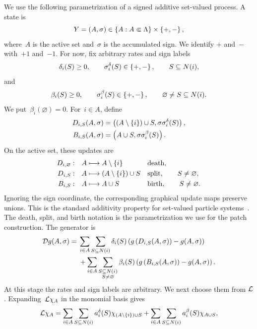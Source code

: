 We use the following parametrization of a signed additive set-valued process. A
state is
\begin{equation*}
Y=(A,\sigma)
\in
\left\{A:A\Subset\Lambda\right\}\times\left\{+,-\right\},
\end{equation*}
where~$A$ is the active set and~$\sigma$ is the accumulated sign. We identify
$+$ and~$-$ with~$+1$ and~$-1$. For now, fix arbitrary rates and sign labels
\begin{equation*}
\delta_i(S)\geq0,
\qquad
\sigma_i^\delta(S)\in\left\{+,-\right\},
\qquad
S\subseteq N(i),
\end{equation*}
and
\begin{equation*}
\beta_i(S)\geq0,
\qquad
\sigma_i^\beta(S)\in\left\{+,-\right\},
\qquad
\varnothing\neq S\subseteq N(i).
\end{equation*}
We put~$\beta_i(\varnothing)=0$. For~$i\in A$, define
\begin{align*}
D_{i,S}(A,\sigma)
&=
\left(\left(A\setminus\left\{i\right\}\right)\cup S,
\sigma\sigma_i^\delta(S)\right),
\\
B_{i,S}(A,\sigma)
&=
\left(A\cup S,
\sigma\sigma_i^\beta(S)\right).
\end{align*}
On the active set, these updates are
\begin{align*}
D_{i,\varnothing}:&\quad A\longmapsto A\setminus\left\{i\right\}
&&\text{death},
\\
D_{i,S}:&\quad A\longmapsto \left(A\setminus\left\{i\right\}\right)\cup S
&&\text{split},\qquad S\neq\varnothing,
\\
B_{i,S}:&\quad A\longmapsto A\cup S
&&\text{birth},\qquad S\neq\varnothing.
\end{align*}
Ignoring the sign coordinate, the corresponding graphical update maps
preserve unions. This is the standard additivity property for set-valued
particle systems~\cite{Harris1978,Griffeath1979,Gray1986}. The death, split,
and birth notation is the parametrization we use for the patch construction.
The generator is
\begin{align*}
\mathcal{D} g(A,\sigma)
={}&
\sum_{i\in A}\sum_{S\subseteq N(i)}
\delta_i(S)
\left(g\left(D_{i,S}(A,\sigma)\right)-g(A,\sigma)\right)
\\
&+
\sum_{i\in A}
\sum_{\substack{S\subseteq N(i)\\S\neq\varnothing}}
\beta_i(S)
\left(g\left(B_{i,S}(A,\sigma)\right)-g(A,\sigma)\right).
\end{align*}
At this stage the rates and sign labels are arbitrary. We next choose them from
$\mathcal{L}$.
Expanding~$\mathcal{L}\chi_A$ in the monomial basis gives
\begin{equation}
\label{eq:signed-dual-generator-expansion}
\mathcal{L}\chi_A
=
\sum_{i\in A}\sum_{S\subseteq N(i)}
a_i^\delta(S)\chi_{\left(A\setminus\left\{i\right\}\right)\cup S}
+
\sum_{i\in A}\sum_{S\subseteq N(i)}
a_i^\beta(S)\chi_{A\cup S},
\end{equation}
